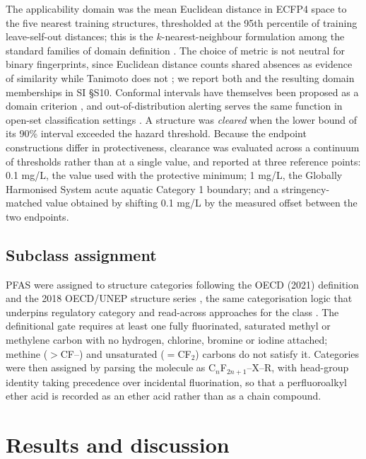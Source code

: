 \documentclass[preprint,12pt]{elsarticle}
\begin{document}
The applicability domain was the mean Euclidean distance in ECFP4 space to the
five nearest training structures, thresholded at the 95th percentile of
training leave-self-out distances; this is the $k$-nearest-neighbour
formulation among the standard families of domain definition
\cite{sahigara2012ad,sahigara2013knnad}. The choice of metric is not neutral
for binary fingerprints, since Euclidean distance counts shared absences as
evidence of similarity while Tanimoto does not \cite{bajusz2015tanimoto}; we
report both and the resulting domain memberships in SI \S S10. Conformal
intervals have themselves been proposed as a domain criterion
\cite{norinder2016cpad}, and out-of-distribution alerting serves the same
function in open-set classification settings
\cite{kang2026openset,kim2026driftrobust}. A structure was \emph{cleared} when the lower
bound of its 90\% interval exceeded the hazard threshold. Because the endpoint
constructions differ in protectiveness, clearance was evaluated across a
continuum of thresholds rather than at a single value, and reported at three
reference points: 0.1 mg/L, the value used with the protective minimum; 1 mg/L,
the Globally Harmonised System acute aquatic Category 1 boundary; and a
stringency-matched value obtained by shifting 0.1 mg/L by the measured offset
between the two endpoints.

\subsection{Subclass assignment}

PFAS were assigned to structure categories following the OECD (2021) definition
and the 2018 OECD/UNEP structure series
\cite{oecd2021pfas,buck2011terminology}, the same categorisation logic that
underpins regulatory category and read-across approaches for the class
\cite{patlewicz2019category}.
The definitional gate requires at least one fully fluorinated, saturated methyl
or methylene carbon with no hydrogen, chlorine, bromine or iodine attached;
methine ($>$CF--) and unsaturated ($=$CF$_2$) carbons do not satisfy it.
Categories were then assigned by parsing the molecule as
C$_n$F$_{2n+1}$--X--R, with head-group identity taking precedence over
incidental fluorination, so that a perfluoroalkyl ether acid is recorded as an
ether acid rather than as a chain compound.

\section{Results and discussion}
\end{document}
